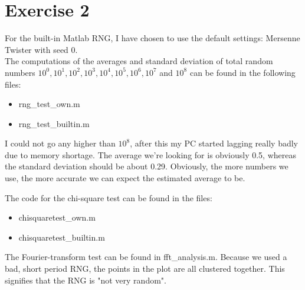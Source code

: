 \section*{Exercise 2}
For the built-in Matlab RNG, I have chosen to use the default settings: Mersenne Twister with seed 0.\\
The computations of the averages and standard deviation of total random numbers $10^{0}, 10^{1}, 10^{2}, 10^{3}, 10^{4}, 10^{5}, 10^{6}, 10^{7}$ and $10^{8}$ can be found in the following files:
\begin{itemize}
	\item rng\_test\_own.m
	\item rng\_test\_builtin.m
\end{itemize}
I could not go any higher than $10^{8}$, after this my PC started lagging really badly due to memory shortage.
The average we're looking for is obviously 0.5, whereas the standard deviation should be about 0.29.
Obviously, the more numbers we use, the more accurate we can expect the estimated average to be.

The code for the chi-square test can be found in the files:
\begin{itemize}
	\item chisquaretest\_own.m
	\item chisquaretest\_builtin.m
\end{itemize}

The Fourier-transform test can be found in fft\_analysis.m. Because we used a bad, short period RNG, the points in the plot are all clustered together. This signifies that the RNG is "not very random".
